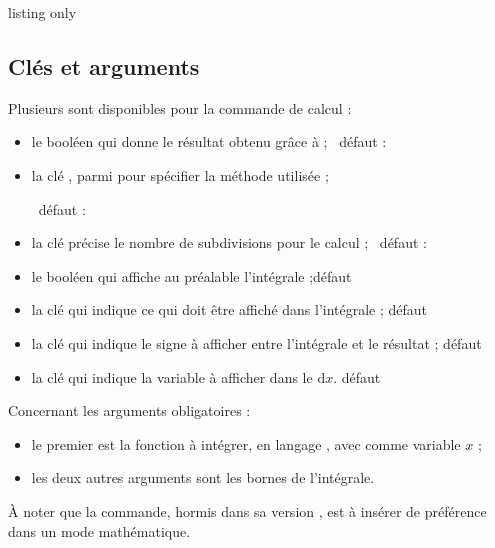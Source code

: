 \begin{PresCodeTexPL}{listing only}
\end{PresCodeTexPL}

\subsection{Clés et arguments}

\begin{cautionblock}
Plusieurs  sont disponibles pour la commande de calcul :

\begin{itemize}
	\item le booléen  qui donne le résultat obtenu grâce à  ; \hfill~défaut : 
	\item la clé , parmi  pour spécifier la méthode utilisée ;
	
	\hfill~défaut : 
	\item la clé  précise le nombre de subdivisions pour le calcul ; \hfill~défaut : 
	\item le booléen  qui affiche au préalable l'intégrale ;\hfill{}défaut 
	\item la clé  qui indique ce qui doit être affiché dans l'intégrale ; \hfill{}défaut 
	\item la clé  qui indique le signe à afficher entre l'intégrale et le résultat ; \hfill{}défaut 
	\item la clé  qui indique la variable à afficher dans le $\text{d}x$. \hfill{}défaut 
\end{itemize}

\smallskip

Concernant les arguments obligatoires :

\begin{itemize}
	\item le premier est la fonction à intégrer, en langage , avec comme variable $x$ ;
	\item les deux autres arguments sont les bornes de l'intégrale.
\end{itemize}

À noter que la commande, hormis dans sa version , est à insérer de préférence dans un mode mathématique.
\end{cautionblock}

